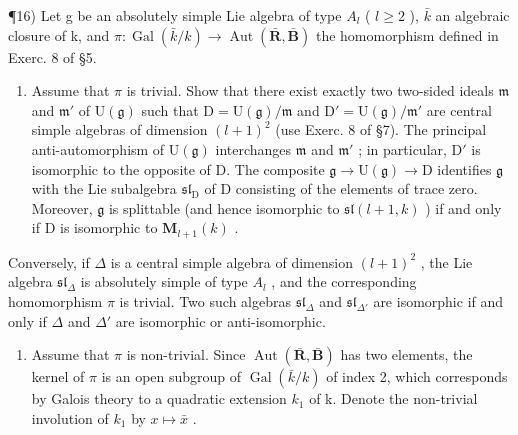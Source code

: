 ¶16) Let g be an absolutely simple Lie algebra of type \(A_{l}\) ( \(l \geq 2\) ), \(\bar{k}\) an algebraic closure of k, and \(\pi : \operatorname{Gal}(\bar{k}/k) \to \operatorname{Aut}(\bar{\mathbf{R}},\bar{\mathbf{B}})\) the homomorphism defined in Exerc. 8 of §5.

\begin{enumerate}
\def\labelenumi{\alph{enumi})}
\tightlist
\item
  Assume that \(\pi\) is trivial. Show that there exist exactly two two-sided ideals \(\mathfrak{m}\) and \(\mathfrak{m}'\) of \(\mathrm{U}(\mathfrak{g})\) such that \(\mathrm{D} = \mathrm{U}(\mathfrak{g}) / \mathfrak{m}\) and \(\mathrm{D}' = \mathrm{U}(\mathfrak{g}) / \mathfrak{m}'\) are central simple algebras of dimension \((l + 1)^2\) (use Exerc. 8 of §7). The principal anti-automorphism of \(\mathrm{U}(\mathfrak{g})\) interchanges \(\mathfrak{m}\) and \(\mathfrak{m}'\) ; in particular, \(\mathrm{D}'\) is isomorphic to the opposite of D. The composite \(\mathfrak{g} \to \mathrm{U}(\mathfrak{g}) \to \mathrm{D}\) identifies \(\mathfrak{g}\) with the Lie subalgebra \(\mathfrak{sl}_{\mathrm{D}}\) of D consisting of the elements of trace zero. Moreover, \(\mathfrak{g}\) is splittable (and hence isomorphic to \(\mathfrak{sl}(l + 1,k)\) ) if and only if D is isomorphic to \(\mathbf{M}_{l + 1}(k)\) .
\end{enumerate}

Conversely, if \(\Delta\) is a central simple algebra of dimension \((l + 1)^2\) , the Lie algebra \(\mathfrak{sl}_{\Delta}\) is absolutely simple of type \(A_l\) , and the corresponding homomorphism \(\pi\) is trivial. Two such algebras \(\mathfrak{sl}_{\Delta}\) and \(\mathfrak{sl}_{\Delta'}\) are isomorphic if and only if \(\Delta\) and \(\Delta'\) are isomorphic or anti-isomorphic.

\begin{enumerate}
\def\labelenumi{\alph{enumi})}
\setcounter{enumi}{1}
\tightlist
\item
  Assume that \(\pi\) is non-trivial. Since \(\operatorname{Aut}(\bar{\mathbf{R}},\bar{\mathbf{B}})\) has two elements, the kernel of \(\pi\) is an open subgroup of \(\operatorname{Gal}(\bar{k}/k)\) of index 2, which corresponds by Galois theory to a quadratic extension \(k_{1}\) of k. Denote the non-trivial involution of \(k_{1}\) by \(x\mapsto\bar{x}\) .
\end{enumerate}

